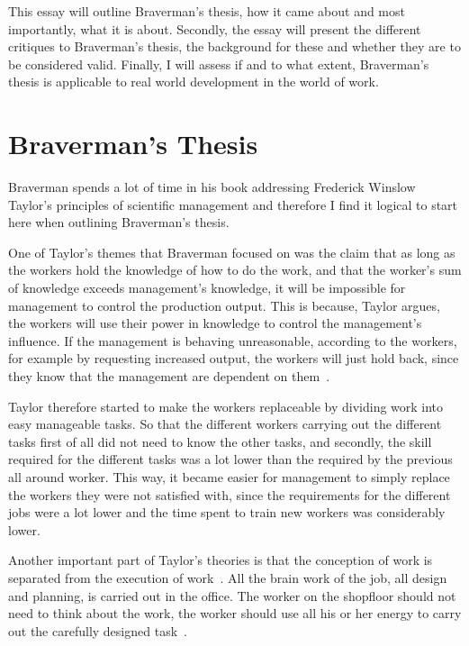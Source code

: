 \documentclass[a4paper,12pt,titlepage]{article}
\begin{document}
  This essay will outline Braverman's thesis, how it came about
  and most importantly, what it is about. Secondly, the essay
  will present the different critiques to Braverman's thesis,
  the background for these and whether they are to be considered
  valid. Finally, I will assess if and to what extent, Braverman's
  thesis is applicable to real world development in the world of work.
  
  \section{Braverman's Thesis}
  Braverman spends a lot of time in his book addressing Frederick Winslow Taylor's
  principles of scientific management and therefore I find it logical
  to start here when outlining Braverman's thesis.

  One of Taylor's themes that Braverman focused on was the claim that
  as long as the workers hold the knowledge of how to do the work, and that
  the worker's sum of knowledge exceeds management's knowledge, it will be
  impossible for management to control the production output. This is because,
  Taylor argues, the workers will use their power in knowledge to
  control the management's influence. If the management is behaving
  unreasonable, according to the workers, for example by requesting
  increased output, the workers will just hold back, since they know that
  the management are dependent on them~\cite[100]{hb}.

  Taylor therefore started to make the workers replaceable by
  dividing work into easy manageable tasks. So that the different workers
  carrying out the different tasks first of all did not need to know the
  other tasks, and secondly, the skill required for the different tasks
  was a lot lower than the required by the previous all around worker.
  This way, it became easier for management to simply  replace the
  workers they were not satisfied with, since the requirements for
  the different jobs were a lot lower and the time spent to train new
  workers was considerably lower.

  Another important part of Taylor's theories is that the conception
  of work is separated from the execution of work~\cite[151]{mnpb}. All
  the brain work of the job, all design and planning, is carried out in
  the office. The worker on the shopfloor should not need to think about
  the work, the worker should use all his or her energy to carry out the
  carefully designed task~\cite[113-120]{hb}.
\end{document}
